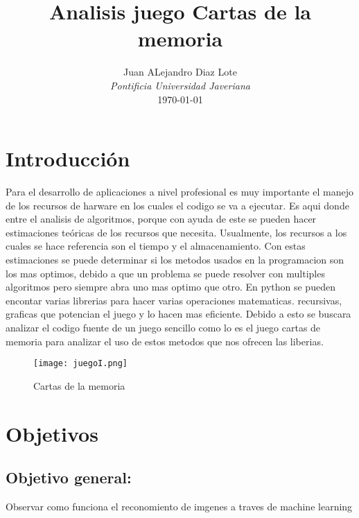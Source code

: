 \documentclass[10pt,twocolumn]{article}
\author{ Juan ALejandro Diaz Lote\\
            \small \textit{Pontificia Universidad Javeriana}\\
            \small \today}
\title{\textbf{Analisis juego Cartas de la memoria  }}
\date{\vspace{-5ex}}
\begin{document}
\twocolumn[
  \begin{@twocolumnfalse}
    \maketitle
    
   \end{@twocolumnfalse}
  ]
 
 \section{Introducción}
 
Para el desarrollo de aplicaciones a nivel profesional es muy importante el manejo de los recursos de harware en los cuales el codigo se va a ejecutar. Es aqui donde entre el analisis de algoritmos, porque con ayuda de este se pueden hacer estimaciones teóricas de los recursos que necesita. Usualmente, los recursos a los cuales se hace referencia son el tiempo y el almacenamiento. Con estas estimaciones se puede determinar si los metodos usados en la programacion son los mas optimos, debido a que un problema se puede resolver con multiples algoritmos pero siempre abra uno mas optimo que otro. En python se pueden encontar varias librerias para hacer varias operaciones matematicas. recursivas, graficas que potencian el juego y lo hacen mas eficiente. Debido a esto se buscara analizar el codigo fuente de un juego sencillo  como lo es el juego cartas de memoria para analizar el uso de estos metodos que nos ofrecen las liberias.


\begin{figure}[ht]
  \centering
  \texttt{[image: juegoI.png]}
  \caption{Cartas de la memoria}
\end{figure}

\section{Objetivos}
\subsection{Objetivo general:}

 Observar como funciona el reconomiento de imgenes a traves de machine learning 
\end{document}
